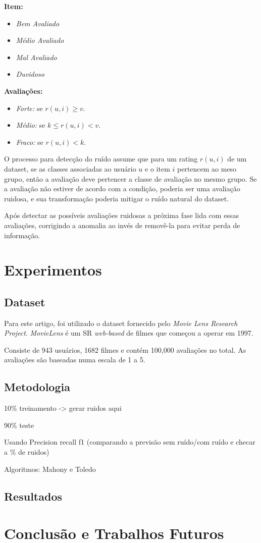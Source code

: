 \documentclass{sig-alternate}
\begin{document}
\textbf{Item: }
\begin{itemize}
	\item \emph{Bem Avaliado}
	\item \emph{Médio Avaliado}
	\item \emph{Mal Avaliado}
	\item \emph{Duvidoso}
\end{itemize}

\textbf{Avaliações: }
\begin{itemize}
	\item \emph{Forte: } se $r(u,i) \geq v$.
	\item \emph{Médio: } se $k \leq r(u,i) < v$.
	\item \emph{Fraco:} se $r(u,i) < k$.
\end{itemize}

O processo para detecção do ruído assume que para um rating $r(u,i)$ de um dataset, se as classes associadas ao usuário $u$ e o item $i$ pertencem ao meso grupo, então a avaliação deve pertencer a classe de avaliação no mesmo grupo. Se a avaliação não estiver de acordo com a condição, poderia ser uma avaliação ruidosa, e sua transformação poderia mitigar o ruído natural do dataset. 

Após detectar as possíveis avaliações ruidosas a próxima fase lida com essas avaliações, corrigindo a anomalia ao invés de removê-la para evitar perda de informação.

\section{Experimentos}


\subsection{Dataset}
Para este artigo, foi utilizado o dataset fornecido pelo \emph{Movie Lens Research Project}. \emph{MovieLens} é um SR \emph{web-based} de filmes que começou a operar em 1997.

Consiste de 943 usuários, 1682 filmes e contém 100,000 avaliações no total. As avaliações são baseadas numa escala de 1 a 5.

\subsection{Metodologia}

10\% treinamento -> gerar ruidos aqui

90\% teste

Usando Precision recall f1 (comparando a previsão sem ruído/com ruído e checar a \% de ruidos)

Algoritmos: Mahony e Toledo


\subsection{Resultados}

\section{Conclusão e Trabalhos Futuros}
\end{document}
